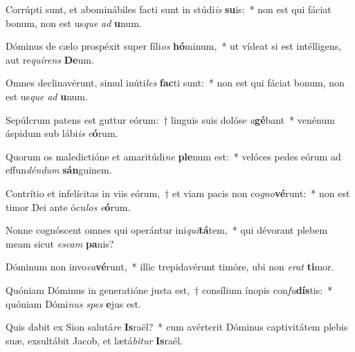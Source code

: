 \item Corrúpti sunt, et abominábiles facti sunt in stúdi\textit{is} \textbf{su}is:~* non est qui fáciat bonum, non est us\textit{que} \textit{ad} \textbf{u}num.
\item Dóminus de cælo prospéxit super fíli\textit{os} \textbf{hó}minum,~* ut vídeat si est intélligens, aut re\textit{quí}\textit{rens} \textbf{De}um.
\item Omnes declinavérunt, simul inúti\textit{les} \textbf{fac}ti sunt:~* non est qui fáciat bonum, non est us\textit{que} \textit{ad} \textbf{u}num.
\item Sepúlcrum patens est guttur eórum:~† linguis suis dolóse \textit{a}\textbf{gé}bant~* venénum áspidum sub lábi\textit{is} \textit{e}\textbf{ó}rum.
\item Quorum os maledictióne et amaritúdi\textit{ne} \textbf{ple}num est:~* velóces pedes eórum ad effun\textit{dén}\textit{dum} \textbf{sán}guinem.
\item Contrítio et infelícitas in viis eórum,~† et viam pacis non co\textit{gno}\textbf{vé}runt:~* non est timor Dei ante ócu\textit{los} \textit{e}\textbf{ó}rum.
\item Nonne cognóscent omnes qui operántur ini\textit{qui}\textbf{tá}tem,~* qui dévorant plebem meam sicut \textit{es}\textit{cam} \textbf{pa}nis?
\item Dóminum non invo\textit{ca}\textbf{vé}runt,~* illic trepidavérunt timóre, ubi non \textit{e}\textit{rat} \textbf{ti}mor.
\item Quóniam Dóminus in generatióne justa est,~† consílium ínopis con\textit{fu}\textbf{dís}tis:~* quóniam Dómi\textit{nus} \textit{spes} \textbf{e}jus est.
\item Quis dabit ex Sion salutá\textit{re} \textbf{Is}raël?~* cum avérterit Dóminus captivitátem plebis suæ, exsultábit Jacob, et lætá\textit{bi}\textit{tur} \textbf{Is}raël.
